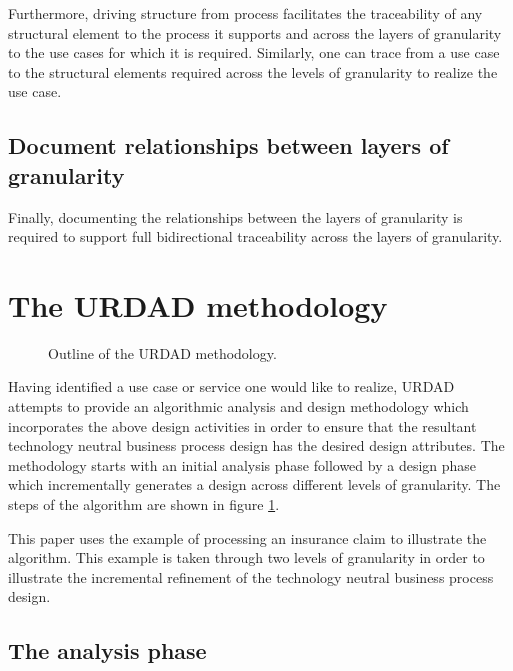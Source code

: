 \documentclass{IOS-Book-Article}
\begin{document}
Furthermore, driving structure from process facilitates the traceability of any structural element to the process it supports
and across the layers of granularity to the use cases for which it is required. Similarly, one can trace from a use case
to the structural elements required across the levels of granularity to realize the use case.


\subsection{Document relationships between layers of granularity}

Finally, documenting the relationships between the layers of granularity is required to support full
bidirectional traceability across the layers of granularity.


\section{The URDAD methodology}

\begin{figure}[tb]
  \centering
  \caption{Outline of the URDAD methodology.}
  \label{fig:methodology}
\end{figure}

Having identified a use case or service one would like to realize, URDAD attempts to provide 
an algorithmic analysis and design methodology which incorporates the above design activities
in order to ensure that the resultant technology neutral business process design has the desired design attributes. The methodology starts with an initial analysis phase followed by a design phase
which incrementally generates a design across different levels of granularity.
The steps of the algorithm are shown in figure \ref{fig:methodology}.

This paper uses the example of processing an insurance claim to illustrate the algorithm. This example
is taken through two levels of granularity in order to illustrate the incremental refinement of the technology
neutral business process design.


\subsection{The analysis phase}
\end{document}

